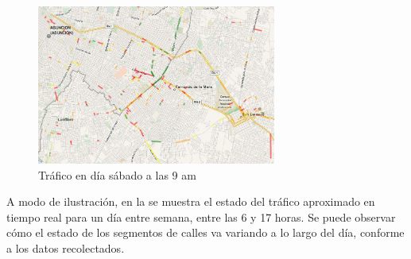 \begin{figure}[!ht]
	\centering
	\includegraphics[width=0.7\textwidth]{capitulos/7/figuras/figura7.jpg}
	\caption{\label{fig:trafico_sabado} Tráfico en día sábado a las 9 am}	
\end{figure}

A modo de ilustración, en la  se muestra el estado del tráfico aproximado en tiempo real para un día entre semana, entre las 6 y 17 horas. Se puede observar cómo el estado de los segmentos de calles va variando a lo largo del día, conforme a los datos recolectados.

